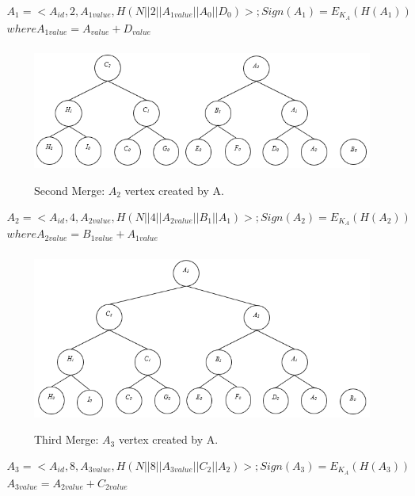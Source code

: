 \begin{exmp}
				\begin{equation}
					\begin{array}{l}
				A_{1} = <A_{id}, 2, A_{1value}, H(N||2||A_{1value}||A_{0}||D_{0})>; Sign(A_{1}) = E_{K_{A}}(H(A_{1}))\\
				where A_{1value} = A_{value} + D_{value} \\
					\end{array}	
				\end{equation}
				\begin{figure}[h!]
					\centering
					\includegraphics[scale = 1]{images/commitment-tree-example-3.png}\\
					\caption{Second Merge: $A_{2}$ vertex created by A.}
					\label{fig:commitment-tree-example-3}
				\end{figure}
				\begin{equation}
					\begin{array}{l}
						A_{2} = <A_{id}, 4, A_{2value}, H(N||4||A_{2value}||B_{1}||A_{1}) >; Sign(A_{2}) = E_{K_{A}}(H({A_{2}}))\\
						where A_{2value} = B_{1value} + A_{1value} \\
					\end{array}
				\end{equation}
				\begin{figure}[h!]
					\centering
					\includegraphics[scale = 1]{images/commitment-tree-example-4.png}\\
					\caption{Third Merge: $A_{3}$ vertex created by A.}
					\label{fig:commitment-tree-example-4}
				\end{figure}

				\begin{equation}
					\begin{array}{l}
						A_{3} = <A_{id},8, A_{3value},H(N||8||A_{3value}||C_{2}||A_{2})>; Sign(A_{3}) = E_{K_{A}}(H(A_{3}))\\
						A_{3value} = A_{2value} + C_{2value}
					\end{array}
				\end{equation}
			\end{exmp}

